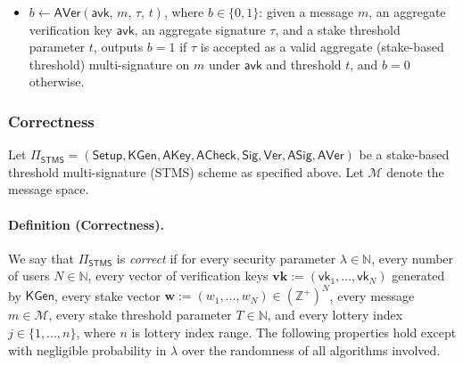 \documentclass{article}
\newcommand{\vk}[0]{\mathsf{vk}}
\newcommand{\ZZ}[0]{\mathbb{Z}}
\begin{document}
\begin{itemize}
  \item $b \leftarrow \mathsf{AVer}(\mathsf{avk},\, m,\, \tau,\, t)$, where $b \in \{0,1\}$:  
        given a message $m$, an aggregate verification key $\mathsf{avk}$, an aggregate signature $\tau$,  
        and a stake threshold parameter $t$, outputs $b = 1$ if $\tau$ is accepted as a valid aggregate  
        (stake-based threshold) multi-signature on $m$ under $\mathsf{avk}$ and threshold $t$, and $b = 0$ otherwise.

\end{itemize}



\subsubsection{Correctness}

Let 
$
  \Pi_{\mathsf{STMS}}
  =
  (\mathsf{Setup}, \mathsf{KGen}, \mathsf{AKey}, \mathsf{ACheck},
   \mathsf{Sig}, \mathsf{Ver}, \mathsf{ASig}, \mathsf{AVer})
$
be a stake-based threshold multi-signature (STMS) scheme as specified above.  
Let $\mathcal{M}$ denote the message space.

\paragraph{Definition (Correctness).}
We say that $\Pi_{\mathsf{STMS}}$ is \emph{correct} if for every security parameter $\lambda \in \mathbb{N}$,
every number of users $N \in \mathbb{N}$, every vector of verification keys
$\mathbf{vk} := (\vk_1,\dots,\vk_N)$ generated by $\mathsf{KGen}$, every stake vector
$\mathbf{w} := (w_1,\dots,w_N) \in(\ZZ^+)^{N}$, every message $m \in \mathcal{M}$, 
every stake threshold parameter $T \in \mathbb{N} $, and every lottery index $j \in \{1,...,n\}$, where $n$ is lottery index range. 
The following properties hold except with negligible probability in $\lambda$ over the randomness of all algorithms involved.
\end{document}
